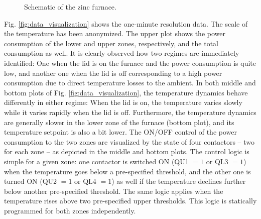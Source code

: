 \documentclass[conference]{IEEEtran}
\begin{document}
\begin{figure}[t]
    \centering
    \begin{adjustbox}{width=0.55\columnwidth}
        
    \end{adjustbox}
    \caption{\small{Schematic of the zinc furnace. 
            \vspace{-4mm}
    }}
    \label{fig:furnace_schematic_tikz}
\end{figure}

Fig. \ref{fig:data_visualization} shows the one-minute resolution data. The scale of the temperature has been anonymized. The upper plot shows the power consumption of the lower and upper zones, respectively, and the total consumption as well. It is clearly observed how two regimes are immediately identified: One when the lid is on the furnace and the power consumption is quite low, and another one when the lid is off corresponding to a high power consumption due to direct temperature losses to the ambient. In both middle and bottom plots of Fig. \ref{fig:data_visualization}, the temperature dynamics behave differently in either regime: When the lid is on, the temperature varies slowly while it varies rapidly when the lid is off. Furthermore, the temperature dynamics are generally slower in the lower zone of the furnace (bottom plot), and its temperature setpoint is also a bit lower. The ON/OFF control of the power consumption to the two zones are visualized by the state of four contactors -- two for each zone -- as depicted in the middle and bottom plots. The control logic is simple for a given zone: one contactor is switched ON (QU1 $=1$ or QL3 $=1$) when the temperature goes below a pre-specified threshold, and the other one is turned ON (QU2 $=1$ or QL4 $=1$) as well if the temperature declines further below another pre-specified threshold. The same logic applies when the temperature rises above two pre-specified upper thresholds. This logic is statically programmed for both zones independently.
\end{document}
